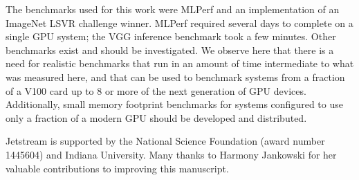 \documentclass[acmtog, authorversion]{acmart}
\begin{document}
The benchmarks used for this work were MLPerf and an implementation of an ImageNet LSVR challenge winner. MLPerf required several days to complete on a single GPU system; the VGG inference benchmark took a few minutes. Other benchmarks \cite{bench-design} exist and should be investigated. We observe here that there is a need for realistic benchmarks that run in an amount of time intermediate to what was measured here, and that can be used to benchmark systems from a fraction of a V100 card up to 8 or more of the next generation of GPU devices. Additionally, small memory footprint benchmarks for systems configured to use only a fraction of a modern GPU should be developed and distributed.

\begin{acks}
Jetstream is supported by the National Science Foundation (award number 1445604) and Indiana University. Many thanks to Harmony Jankowski for her valuable contributions to improving this manuscript.
\end{acks}




\end{document}

